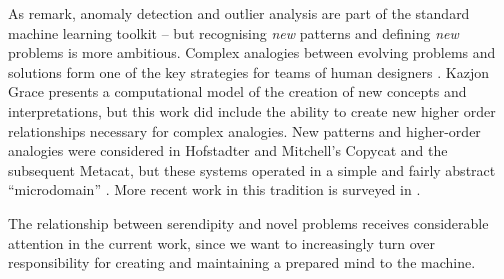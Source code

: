 As \cite[p. 69]{pease2013discussion} remark, anomaly detection and
outlier analysis are part of the standard machine learning toolkit --
but recognising \emph{new} patterns and defining \emph{new} problems
is more ambitious.  Complex analogies between evolving problems and
solutions form one of the key strategies for teams of human designers
\cite{Analogical-problem-evolution-DCC}.  Kazjon Grace
\citeyear{kaz-thesis} presents a computational model of the creation
of new concepts and interpretations, but this work did include the
ability to create new higher order relationships necessary for complex
analogies.  New patterns and higher-order analogies were considered in
Hofstadter and Mitchell's {\sf Copycat} and the subsequent {\sf
  Metacat}, but these systems operated in a simple and fairly abstract
``microdomain''
\cite{hofstadter1994copycat,DBLP:journals/jetai/Marshall06}.  More
recent work in this tradition is surveyed in
\cite{eric-nichols-thesis}.

The relationship between serendipity and novel problems receives
considerable attention in the current work, since we want to
increasingly turn over responsibility for creating and maintaining a
prepared mind to the machine.
